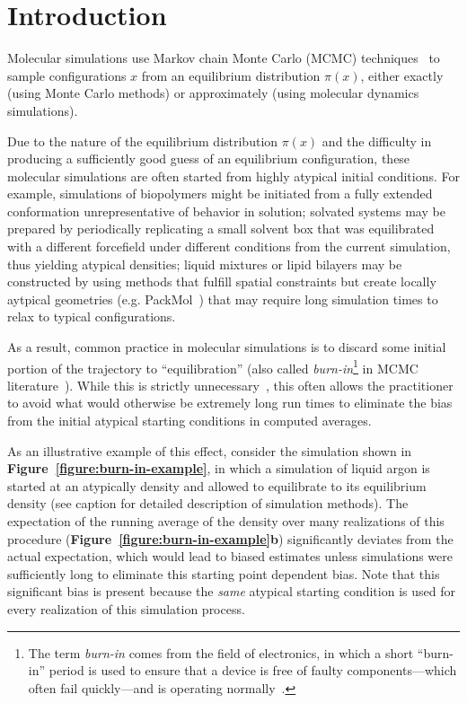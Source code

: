 \documentclass[aps,pre,twocolumn,nofootinbib,superscriptaddress,linenumbers]{revtex4-1}
\begin{document}
\section*{Introduction}
\label{section:introduction}

Molecular simulations use Markov chain Monte Carlo (MCMC) techniques~\cite{jun-s-liu:mcmc} to sample configurations $x$ from an equilibrium distribution $\pi(x)$, either exactly (using Monte Carlo methods) or approximately (using molecular dynamics simulations).

Due to the nature of the equilibrium distribution $\pi(x)$ and the difficulty in producing a sufficiently good guess of an equilibrium configuration, these molecular simulations are often started from highly atypical initial conditions.
For example, simulations of biopolymers might be initiated from a fully extended conformation unrepresentative of behavior in solution; solvated systems may be prepared by periodically replicating a small solvent box that was equilibrated with a different forcefield under different conditions from the current simulation, thus yielding atypical densities; 
liquid mixtures or lipid bilayers may be constructed by using methods that fulfill spatial constraints but create locally aytpical geometries (e.g. PackMol~\cite{martinez:jctc:2009:packmol}) that may require long simulation times to relax to typical configurations.

As a result, common practice in molecular simulations is to discard some initial portion of the trajectory to ``equilibration'' (also called \emph{burn-in}\footnote{The term \emph{burn-in} comes from the field of electronics, in which a short ``burn-in'' period is used to ensure that a device is free of faulty components---which often fail quickly---and is operating normally~\cite{crc-mcmc-handbook}.} in MCMC literature~\cite{crc-mcmc-handbook}).
While this is strictly unnecessary~\cite{geyer:burn-in-unnecessary,crc-mcmc-handbook}, this often allows the practitioner to avoid what would otherwise be extremely long run times to eliminate the bias from the initial atypical starting conditions in computed averages.

As an illustrative example of this effect, consider the simulation shown in {\bf Figure~\ref{figure:burn-in-example}}, in which a simulation of liquid argon is started at an atypically density and allowed to equilibrate to its equilibrium density (see caption for detailed description of simulation methods).
The expectation of the running average of the density over many realizations of this procedure ({\bf Figure~\ref{figure:burn-in-example}b}) significantly deviates from the actual expectation, which would lead to biased estimates unless simulations were sufficiently long to eliminate this starting point dependent bias.
Note that this significant bias is present because the \emph{same} atypical starting condition is used for every realization of this simulation process.
\end{document}
